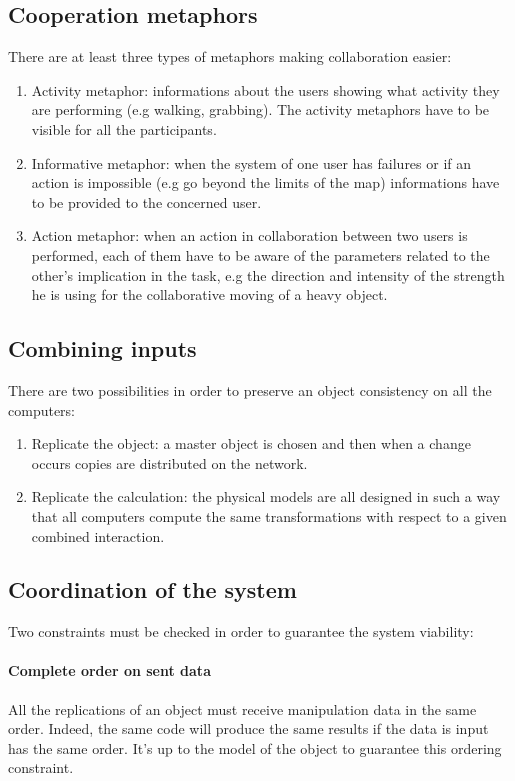 \documentclass[a4paper]{article}
\begin{document}
\subsection{Cooperation metaphors}
There are at least three types of metaphors making collaboration easier:
\begin{enumerate}
	\item Activity metaphor: informations about the users showing what activity they are performing (e.g walking, grabbing). The activity metaphors have to be visible for all the participants.
	\item Informative metaphor: when the system of one user has failures or if an action is impossible (e.g go beyond the limits of the map) informations have to be provided to the concerned user.
	\item Action metaphor: when an action in collaboration between two users is performed, each of them have to be aware of the parameters related to the other's implication in the task, e.g the direction and intensity of the strength he is using for the collaborative moving of a heavy object.
\end{enumerate}

\subsection{Combining inputs}
There are two possibilities in order to preserve an object consistency on all the computers:
\begin{enumerate}
	\item Replicate the object: a master object is chosen and then when a change occurs copies are distributed on the network.
	\item Replicate the calculation: the physical models are all designed in such a way that all computers compute the same transformations with respect to a given combined interaction.
\end{enumerate}

\subsection{Coordination of the system}
Two constraints must be checked in order to guarantee the system viability:

\paragraph{Complete order on sent data} All the replications of an object must receive manipulation data in the same order. Indeed, the same code will produce the same results if the data is input has the same order. It's up to the model of the object to guarantee this ordering constraint.
\end{document}
